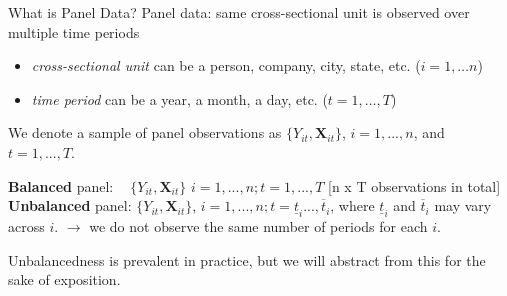 \documentclass[11pt, aspectratio = 169]{beamer}
\begin{document}
\begin{frame}{What is Panel Data?}
Panel data: same cross-sectional unit is observed over multiple time periods 
\begin{itemize}
    \item \textit{cross-sectional unit} can be a person, company, city, state, etc. ($i = 1,…n$) 
    \item \textit{time period} can be a year, a month, a day, etc. ($t = 1,…,T$)
\end{itemize}

We denote a sample of panel observations as  $\{Y_{it}, \boldsymbol{X}_{it}\}$,  $i = 1, ... , n$, and $t = 1, ..., T$.

\bigskip
\pause
\textbf{Balanced} panel: $\: \: \: \: \{Y_{it}, \boldsymbol{X}_{it}\}$ $i = 1, ..., n; t = 1, . . . , T$  \color{gray}[n x T observations in total] \color{black} \\
\textbf{Unbalanced} panel: $\{Y_{it}, \boldsymbol{X}_{it}\}$, $i = 1, ..., n; t = \underline{t}_i . . . , \overline{t}_i$,
where $\underline{t}_i$ and $\overline{t}_i$ may vary across $i$. $\rightarrow$ we do not observe the same number of periods for each $i$.

Unbalancedness is prevalent in practice, but we will abstract from this for the sake of exposition. 
\end{frame}
\end{document}
